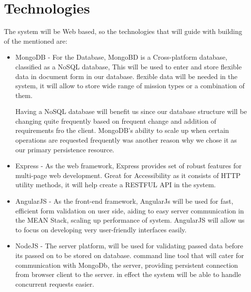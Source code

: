 \documentclass{article}
\begin{document}
	
	\section{Technologies}%
	
	 
	 The system will be Web based, so the technologies that will guide with building of the mentioned are:
	 
	 \begin{itemize}
	 	
	 	
	 	
	 	\item MongoDB - For the Database, MongoBD is a Cross-platform database, classified as a NoSQL database, This will be used to enter and store flexible data in document form in our database. flexible data will be needed in the system, it will allow to store wide range of mission types or a combination of them.
	 	
	 	Having a NoSQL database will benefit us since our database structure will be changing quite frequently based on frequent change and addition of requirements fro the client. MongoDB's ability to scale up when certain operations are requested frequently was another reason why we chose it as our primary persistence resource.
		
	 	\item Express - As the web framework, Express provides set of robust features for multi-page web development. Great for Accessibility as it consists of HTTP utility methods, it will help create a RESTFUL API in the system.
	 	
	 	
	 	\item AngularJS - As the front-end framework, AngularJs will be used for fast, efficient form validation on user side, aiding to easy server communication in the MEAN Stack, scaling up performance of system. AngularJS will allow us to focus on developing very user-friendly interfaces easily.
	 	
	 	\item NodeJS - The server platform, will be used for validating passed data before its passed on to be stored on database. command line  tool that will cater for  communication with MongoDb, the server, providing persistent connection from browser client to the server. in effect the system will be able to handle concurrent requests easier.
	 	

\end{itemize}
\end{document}
